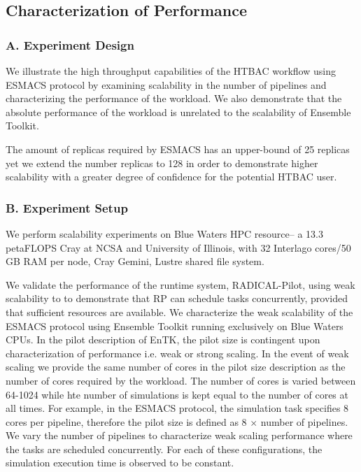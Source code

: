 \subsection{Characterization of Performance}

\subsubsection{A. Experiment Design}

We illustrate the high throughput capabilities of the HTBAC workflow using ESMACS protocol by examining scalability in the number of pipelines and characterizing the performance of the workload. We also demonstrate that the absolute performance of the workload is unrelated to the scalability of Ensemble Toolkit.

The amount of replicas required by ESMACS has an upper-bound of 25 replicas yet we extend the number replicas to 128 in order to demonstrate higher scalability with a greater degree of confidence for the potential HTBAC user.   

\subsubsection{B. Experiment Setup}

We perform scalability experiments on Blue Waters HPC resource-- a 13.3 petaFLOPS Cray at NCSA and University of Illinois, with 32 Interlago cores/50 GB RAM per node, Cray Gemini, Lustre shared file system. 

We validate the performance of the runtime system, RADICAL-Pilot, using weak scalability to to demonstrate that RP can schedule tasks concurrently, provided that sufficient resources are available. We characterize the weak scalability of the ESMACS protocol using Ensemble Toolkit running exclusively on Blue Waters CPUs. In the pilot description of EnTK, the pilot size is contingent upon characterization of performance i.e. weak or strong scaling. In the event of weak scaling we provide the same number of cores in the pilot size description as the number of cores required by the workload. The number of cores is varied between 64-1024 while hte number of simulations is kept equal to the number of cores at all times. For example, in the ESMACS protocol, the simulation task specifies 8 cores per pipeline, therefore the pilot size is defined as 8 $\times$ number of pipelines. We vary the number of pipelines to characterize weak scaling performance where the tasks are scheduled concurrently. For each of these configurations, the simulation execution time is observed to be constant. 

